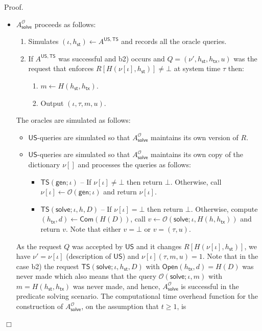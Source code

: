 \documentclass{article}
\newenvironment{proof}{\textsf{Proof}.}{\hfill$\Box$}
\newcommand{\commit}[0]{\mathsf{Com}}
\newcommand{\open}[0]{\mathsf{Open}}
\newcommand{\unisrv}[0]{\mathsf{US}}
\newcommand{\sthash}[0]{h_\mathsf{st}}
\newcommand{\txhash}[0]{h_\mathsf{tx}}
\newcommand{\predi}[0]{\nu}
\newcommand{\systime}[0]{\tau}
\begin{document}
\begin{proof}
\begin{itemize}
\item $A_\mathsf{solve}^{\mathcal{O}}$ proceeds as follows:
 \begin{enumerate}
  \item Simulates $(\iota,\sthash)\gets A^{\mathsf{US},\mathsf{TS}}$ and records all the oracle queries.
  \item If $A^{\mathsf{US},\mathsf{TS}}$ was successful and b2) occurs and $Q=(\predi', \sthash, h_\mathsf{tx}, u)$ was the request that enforces $R[H(\predi[\iota], \sthash)]\neq\bot$ at system time $\tau$ then:
  \begin{enumerate}
    \item[3.] $m\gets H(\sthash, h_\mathsf{tx})$.
    \item[4.] Output $(\iota,\tau,m,u)$.
  \end{enumerate}
 \end{enumerate}
The oracles are simulated as follows:
 \begin{itemize}
  \item $\mathsf{US}$-queries are simulated so that $A_\mathsf{solve}^\mathcal{O}$ maintains its own version of $R$.
  \item $\mathsf{US}$-queries are simulated so that $A_\mathsf{solve}^\mathcal{O}$ maintains its own copy of the dictionary $\predi[]$ and processes the queries as follows:
  \begin{itemize}
      \item $\mathsf{TS}(\mathsf{gen};\iota)$ -- If $\predi[\iota]\neq \bot$ then return $\bot$. Otherwise, call $\predi[\iota]
      \gets\mathcal{O}(\mathsf{gen};\iota)$ and return $\predi[\iota]$.
      \item $\mathsf{TS}(\mathsf{solve};\iota,h,D)$ -- If $\predi[\iota]=\bot$ then return $\bot$. Otherwise, compute $(\txhash,d)\gets\commit(H(D))$, call $v\gets \mathcal{O}(\mathsf{solve};\iota, H(h,\txhash))$ and return $v$. Note that either $v=\bot$ or $v=(\systime,u)$.
  \end{itemize}
 \end{itemize}
 As the request $Q$ was accepted by $\unisrv$ and it changes $R[H(\predi[\iota],\sthash)]$, we have $\predi'=\predi[\iota]$ (description of $\unisrv$) and
 $\predi[\iota](\systime,m,u)=1$. Note that in the case b2) the request $\mathsf{TS}(\mathsf{solve}; \iota, \sthash,D)$ with $\open(\txhash,d)=H(D)$ was never made which also means that the query $\mathcal{O}(\mathsf{solve};\iota,m)$ with $m=H(\sthash,\txhash)$ was never made, and hence,
 $A_\mathsf{solve}^{\mathcal{O}}$ is successful in the predicate solving scenario. The computational time overhead function for the construction of $A_\mathsf{solve}^\mathcal{O}$, on the assumption that $t\ge 1$, is

\end{itemize}
\end{proof}
\end{document}
